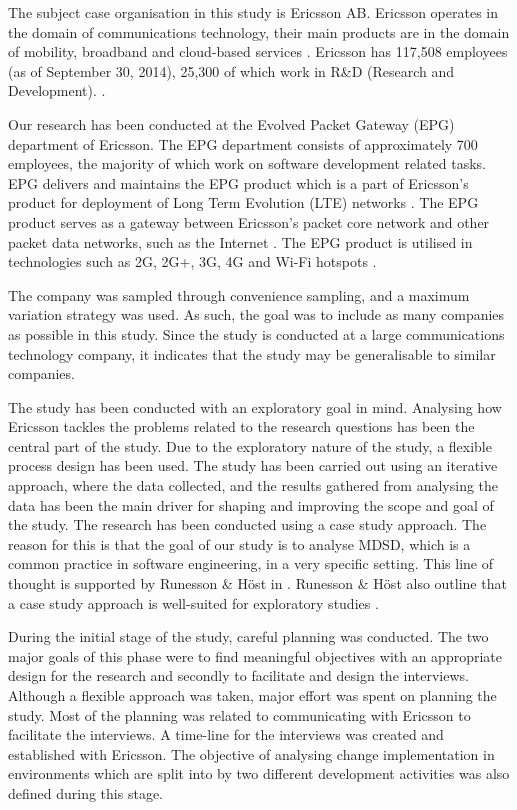 \documentclass[10pt,twocolumn]{article}
\begin{document}

The subject case organisation in this study is Ericsson AB. Ericsson operates in the domain of communications technology, their main products are in the domain of mobility, broadband and cloud-based services \cite{a7} \cite{a8}. Ericsson has 117,508 employees (as of September 30, 2014), 25,300 of which work in R\&D (Research and Development). \cite{a7}. 

Our research has been conducted at the Evolved Packet Gateway (EPG) department of Ericsson. The EPG department consists of approximately 700 employees, the majority of which work on software development related tasks. EPG delivers and maintains the EPG product which is a part of Ericsson's product for deployment of Long Term Evolution (LTE) networks \cite{a9}. The EPG product serves as a gateway between Ericsson's packet core network and other packet data networks, such as the Internet \cite{a9}. The EPG product is utilised in technologies such as 2G, 2G+, 3G, 4G and Wi-Fi hotspots \cite{a9}. 

The company was sampled through convenience sampling, and a maximum variation strategy was used. As such, the goal was to include as many companies as possible in this study. Since the study is conducted at a large communications technology company, it indicates that the study may be generalisable to similar companies. 

The study has been conducted with an exploratory goal in mind. Analysing how Ericsson tackles the problems related to the research questions has been the central part of the study. Due to the exploratory nature of the study, a flexible process design has been used. The study has been carried out using an iterative approach, where the data collected, and the results gathered from analysing the data has been the main driver for shaping and improving the scope and goal of the study. The research has been conducted using a case study approach. The reason for this is that the goal of our study is to analyse MDSD, which is a common practice in software engineering, in a very specific setting. This line of thought is supported by Runesson \& Höst in \cite{runeson2009guidelines}. Runesson \& Höst also outline that a case study approach is well-suited for exploratory studies \cite{runeson2009guidelines}. 

During the initial stage of the study, careful planning was conducted. The two major goals of this phase were to find meaningful objectives with an appropriate design for the research and secondly to facilitate and design the interviews. Although a flexible approach was taken, major effort was spent on planning the study. Most of the planning was related to communicating with Ericsson to facilitate the interviews. A time-line for the interviews was created and established with Ericsson. The objective of analysing change implementation in environments which are split into by two different development activities was also defined during this stage. 
\end{document}
